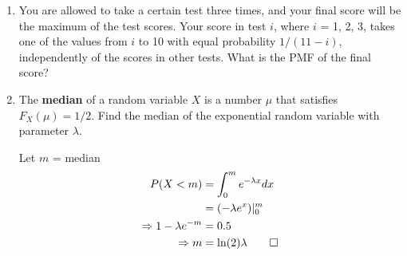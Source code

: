\documentclass[paper=usletter, fontsize=12pt]{article}
\begin{document}
\begin{enumerate}
        \item You are allowed to take a certain test three times, and your
        final score will be the maximum of the test scores. Your score in test
        $i$, where $i$ = 1, 2, 3, takes one of the values from $i$ to 10 with
        equal probability $1/(11-i)$, independently of the scores in other
        tests. What is the PMF of the final score?
        \begin{cproof}
        \end{cproof}

        \item The \textbf{median} of a random variable $X$ is a number $\mu$
        that satisfies $F_X(\mu)=1/2$. Find the median of the exponential
        random variable with parameter $\lambda$.
        \begin{cproof}

            Let $m$ = median
            \begin{align*}
                P(X < m) & = \int_{0}^{m}e^{-\lambda x}dx\\
                & = (-\lambda e^{x})\vert_{0}^{m}\\
                \Rightarrow 1 - \lambda e^{-m} & = 0.5\\
                \Rightarrow m & = \ln(2)\lambda \qedhere
            \end{align*}
            \endgroup

        \end{cproof}

    \end{enumerate}
\end{document}
